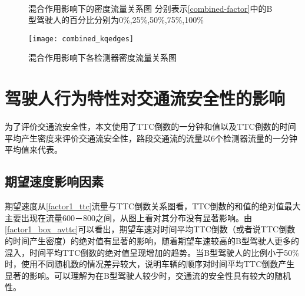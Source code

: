 \begin{figure}[htb]%
\centering
{}%
\\%
%
\caption[A set of four sub-floats.]{混合作用影响下的密度流量关系图
分别表示\autoref{combined-factor}中的B型驾驶人的百分比分别为0\%,25\%,50\%,75\%,100\%}%
\label{combined_kq}%
\end{figure}

\begin{figure}[htb]
\begin{center}
\texttt{[image: combined\_kqedges]}
\caption{混合作用影响下各检测器密度流量关系图}
\label{combined_kqedges}
\end{center}
\end{figure}

\FloatBarrier

\section{驾驶人行为特性对交通流安全性的影响}

为了评价交通流安全性，本文使用了TTC倒数的一分钟和值以及TTC倒数的时间平均产生密度来评价交通流安全性，路段交通流的流量以6个检测器流量的一分钟平均值来代表。


\subsection{期望速度影响因素}

期望速度从\autoref{factor1_ttc}流量与TTC倒数关系图看，TTC倒数的和值的绝对值最大主要出现在流量600－800之间，从图上看对其分布没有显著影响。由\autoref{factor1_box_avttc}可以看出，期望车速对时间平均TTC倒数（或者说TTC倒数的时间产生密度）的绝对值有显著的影响，随着期望车速较高的B型驾驶人更多的混入，时间平均TTC倒数的绝对值呈现增加的趋势。当B型驾驶人的比例小于50\%时，使用不同随机数的情况差异较大，说明车辆的顺序对时间平均TTC倒数产生显著的影响。可以理解为在B型驾驶人较少时，交通流的安全性具有较大的随机性。

